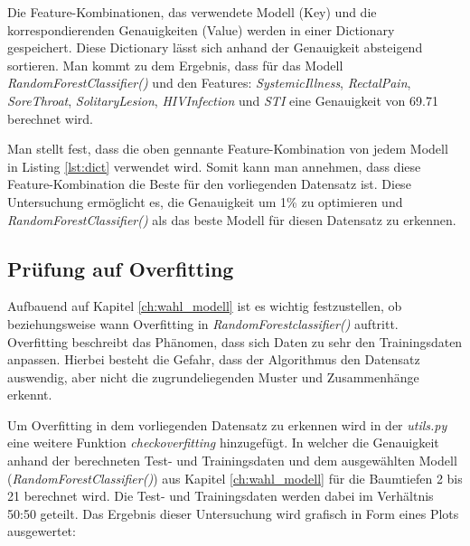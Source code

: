 \documentclass[13pt,a4paper, listof=entryprefix, bibliography=totocnumbered,toc=listofnumbered,lof=listofnumbered]{scrartcl}
\begin{document}
Die Feature-Kombinationen, das verwendete Modell (Key) und die korrespondierenden Genauigkeiten (Value) werden in 
einer Dictionary gespeichert. Diese Dictionary lässt sich anhand der Genauigkeit absteigend sortieren. Man kommt zu dem Ergebnis, dass für das Modell \textit{RandomForestClassifier()} und 
den Features: \textit{Systemic\textunderscore  Illness}, \textit{Rectal\textunderscore Pain}, \textit{Sore\textunderscore Throat}, \textit{Solitary\textunderscore Lesion}, \textit{HIV\textunderscore Infection} und \textit{STI} 
eine Genauigkeit von 69.71 berechnet wird.  

	


Man stellt fest, dass die oben gennante Feature-Kombination von jedem Modell in Listing \ref{lst:dict} verwendet wird. Somit kann man annehmen, dass diese
Feature-Kombination die Beste für den vorliegenden Datensatz ist. Diese Untersuchung ermöglicht es, die Genauigkeit um 1\% zu optimieren und \textit{RandomForestClassifier()} als das beste Modell für
diesen Datensatz zu erkennen.  

	\subsection{Prüfung auf Overfitting}
		\label{ch:pruefung_overfitting}

Aufbauend auf Kapitel \ref{ch:wahl_modell} ist es wichtig festzustellen, ob beziehungsweise wann Overfitting in \textit{RandomForestclassifier()} auftritt. Overfitting beschreibt das Phänomen, dass
sich Daten zu sehr den Trainingsdaten anpassen. Hierbei besteht die Gefahr, dass der Algorithmus den Datensatz auswendig, aber nicht die zugrundeliegenden Muster und Zusammenhänge erkennt.

Um Overfitting in dem vorliegenden Datensatz zu erkennen wird in der \textit{utils.py} eine weitere Funktion \textit{check\textunderscore over\textunderscore fitting} hinzugefügt. In welcher
die Genauigkeit anhand der berechneten Test- und Trainingsdaten und dem ausgewählten Modell (\textit{RandomForestClassifier()}) aus 
Kapitel \ref{ch:wahl_modell} für die Baumtiefen 2 bis 21 berechnet wird. Die Test- und Trainingsdaten werden dabei im Verhältnis 50:50 geteilt. 
Das Ergebnis dieser Untersuchung wird grafisch in Form eines Plots ausgewertet: 
\end{document}
